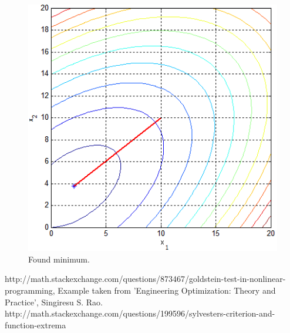 \documentclass[12pt]{article}
\begin{document}
\begin{figure}[H]
	\begin{center}
		\includegraphics[width=16cm]{spirngs_results.png}
		\caption{Found minimum.}
	\end{center}
\end{figure}	


	
\begin{thebibliography}{99}
 http://math.stackexchange.com/questions/873467/goldstein-test-in-nonlinear-programming,
Example taken from 'Engineering Optimization: Theory and Practice', Singiresu S. Rao.
 http://math.stackexchange.com/questions/199596/sylvesters-criterion-and-function-extrema
\end{thebibliography}
	
	
\end{document}
